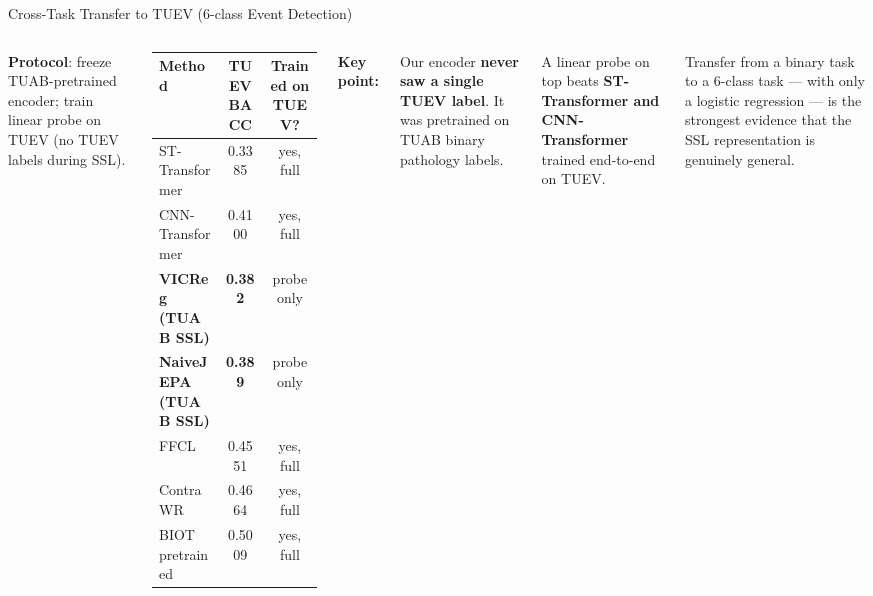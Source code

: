 \documentclass[aspectratio=169,10pt]{beamer}
\begin{document}
\begin{frame}{Cross-Task Transfer to TUEV (6-class Event Detection)}
\begin{columns}[T]
\textbf{Protocol}: freeze TUAB-pretrained encoder; train linear probe on TUEV (no TUEV labels during SSL).

\vspace{0.5em}
\begin{tabular}{lcc}
\toprule
Method & TUEV BACC & Trained on TUEV? \\
\midrule
ST-Transformer & 0.3385 & \textcolor{warn}{yes, full} \\
CNN-Transformer & 0.4100 & \textcolor{warn}{yes, full} \\
\midrule
\textbf{VICReg (TUAB SSL)} & \textbf{0.382} & \textcolor{good}{probe only} \\
\textbf{NaiveJEPA (TUAB SSL)} & \textbf{0.389} & \textcolor{good}{probe only} \\
\midrule
FFCL & 0.4551 & \textcolor{warn}{yes, full} \\
ContraWR & 0.4664 & \textcolor{warn}{yes, full} \\
BIOT pretrained & 0.5009 & \textcolor{warn}{yes, full} \\
\bottomrule
\end{tabular}

\textbf{Key point:}

Our encoder \textbf{never saw a single TUEV label}. It was pretrained on TUAB binary pathology labels.

\vspace{0.5em}
A linear probe on top beats \textbf{ST-Transformer and CNN-Transformer} trained end-to-end on TUEV.

\vspace{0.5em}
\textcolor{accent}{Transfer from a binary task to a 6-class task — with only a logistic regression — is the strongest evidence that the SSL representation is genuinely general.}
\end{columns}
\end{frame}
\end{document}
